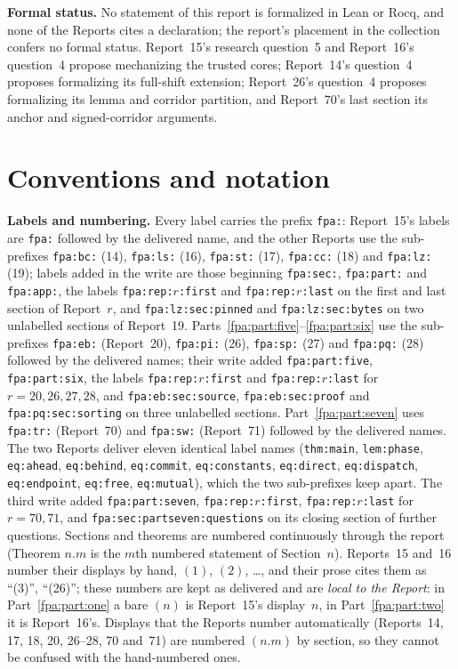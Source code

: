 \documentclass[11pt,a4paper]{article}
\numberwithin{equation}{section}
\begin{document}
\textbf{Formal status.} No statement of this report is formalized in Lean or Rocq, and none of the Reports cites a declaration; the report's placement in the collection confers no formal status. Report~15's research question~5 and Report~16's question~4 propose mechanizing the trusted cores; Report~14's question~4 proposes formalizing its full-shift extension; Report~26's question~4 proposes formalizing its lemma and corridor partition, and Report~70's last section its anchor and signed-corridor arguments.

\section{Conventions and notation}\label{fpa:sec:notation}
\textbf{Labels and numbering.} Every label carries the prefix \texttt{fpa:}: Report~15's labels are \texttt{fpa:} followed by the delivered name, and the other Reports use the sub-prefixes \texttt{fpa:bc:} (14), \texttt{fpa:ls:} (16), \texttt{fpa:st:} (17), \texttt{fpa:cc:} (18) and \texttt{fpa:lz:} (19); labels added in the write are those beginning \texttt{fpa:sec:}, \texttt{fpa:part:} and \texttt{fpa:app:}, the labels \texttt{fpa:rep:}$r$\texttt{:first} and \texttt{fpa:rep:}$r$\texttt{:last} on the first and last section of Report~$r$, and \texttt{fpa:lz:sec:pinned} and \texttt{fpa:lz:sec:bytes} on two unlabelled sections of Report~19. Parts~\ref{fpa:part:five}--\ref{fpa:part:six} use the sub-prefixes \texttt{fpa:eb:} (Report~20), \texttt{fpa:pi:} (26), \texttt{fpa:sp:} (27) and \texttt{fpa:pq:} (28) followed by the delivered names; their write added \texttt{fpa:part:five}, \texttt{fpa:part:six}, the labels \texttt{fpa:rep:}$r$\texttt{:first} and \texttt{fpa:rep:}$r$\texttt{:last} for $r=20,26,27,28$, and \texttt{fpa:eb:sec:source}, \texttt{fpa:eb:sec:proof} and \texttt{fpa:pq:sec:sorting} on three unlabelled sections. Part~\ref{fpa:part:seven} uses \texttt{fpa:tr:} (Report~70) and \texttt{fpa:sw:} (Report~71) followed by the delivered names. The two Reports deliver eleven identical label names (\texttt{thm:main}, \texttt{lem:phase}, \texttt{eq:ahead}, \texttt{eq:behind}, \texttt{eq:commit}, \texttt{eq:constants}, \texttt{eq:direct}, \texttt{eq:dispatch}, \texttt{eq:endpoint}, \texttt{eq:free}, \texttt{eq:mutual}), which the two sub-prefixes keep apart. The third write added \texttt{fpa:part:seven}, \texttt{fpa:rep:}$r$\texttt{:first}, \texttt{fpa:rep:}$r$\texttt{:last} for $r=70,71$, and \texttt{fpa:sec:partseven:questions} on its closing section of further questions. Sections and theorems are numbered continuously through the report (Theorem $n.m$ is the $m$th numbered statement of Section~$n$). Reports~15 and~16 number their displays by hand, $(1)$, $(2)$, \dots, and their prose cites them as ``(3)'', ``(26)''; these numbers are kept as delivered and are \emph{local to the Report}: in Part~\ref{fpa:part:one} a bare $(n)$ is Report~15's display~$n$, in Part~\ref{fpa:part:two} it is Report~16's. Displays that the Reports number automatically (Reports~14, 17, 18, 20, 26--28, 70 and~71) are numbered $(n.m)$ by section, so they cannot be confused with the hand-numbered ones.
\end{document}
